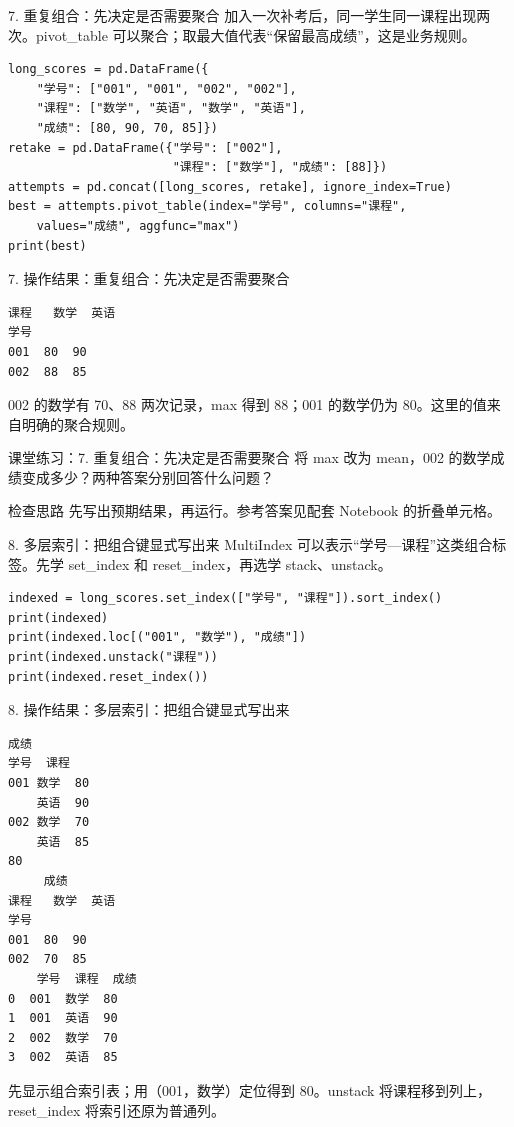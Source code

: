 \documentclass[9pt]{ctexbeamer}
\begin{document}
\begin{frame}[fragile]{7. 重复组合：先决定是否需要聚合}
\small 加入一次补考后，同一学生同一课程出现两次。pivot\_table 可以聚合；取最大值代表“保留最高成绩”，这是业务规则。
\medskip
\begin{lstlisting}[basicstyle=\ttfamily\scriptsize]
long_scores = pd.DataFrame({
    "学号": ["001", "001", "002", "002"],
    "课程": ["数学", "英语", "数学", "英语"],
    "成绩": [80, 90, 70, 85]})
retake = pd.DataFrame({"学号": ["002"],
                       "课程": ["数学"], "成绩": [88]})
attempts = pd.concat([long_scores, retake], ignore_index=True)
best = attempts.pivot_table(index="学号", columns="课程",
    values="成绩", aggfunc="max")
print(best)
\end{lstlisting}
\end{frame}

\begin{frame}[fragile]{7. 操作结果：重复组合：先决定是否需要聚合}
\begin{lstlisting}[language={},numbers=none,basicstyle=\ttfamily\scriptsize]
课程   数学  英语
学号
001  80  90
002  88  85
\end{lstlisting}
\small 002 的数学有 70、88 两次记录，max 得到 88；001 的数学仍为 80。这里的值来自明确的聚合规则。
\end{frame}
\begin{frame}[fragile]{课堂练习：7. 重复组合：先决定是否需要聚合}
将 max 改为 mean，002 的数学成绩变成多少？两种答案分别回答什么问题？
\medskip
\begin{block}{检查思路}
先写出预期结果，再运行。参考答案见配套 Notebook 的折叠单元格。
\end{block}
\end{frame}

\begin{frame}[fragile]{8. 多层索引：把组合键显式写出来}
\small MultiIndex 可以表示“学号—课程”这类组合标签。先学 set\_index 和 reset\_index，再选学 stack、unstack。
\medskip
\begin{lstlisting}[basicstyle=\ttfamily\scriptsize]
indexed = long_scores.set_index(["学号", "课程"]).sort_index()
print(indexed)
print(indexed.loc[("001", "数学"), "成绩"])
print(indexed.unstack("课程"))
print(indexed.reset_index())
\end{lstlisting}
\end{frame}

\begin{frame}[fragile]{8. 操作结果：多层索引：把组合键显式写出来}
\begin{lstlisting}[language={},numbers=none,basicstyle=\ttfamily\scriptsize]
        成绩
学号  课程
001 数学  80
    英语  90
002 数学  70
    英语  85
80
     成绩
课程   数学  英语
学号
001  80  90
002  70  85
    学号  课程  成绩
0  001  数学  80
1  001  英语  90
2  002  数学  70
3  002  英语  85
\end{lstlisting}
\small 先显示组合索引表；用（001，数学）定位得到 80。unstack 将课程移到列上，reset\_index 将索引还原为普通列。
\end{frame}
\end{document}
